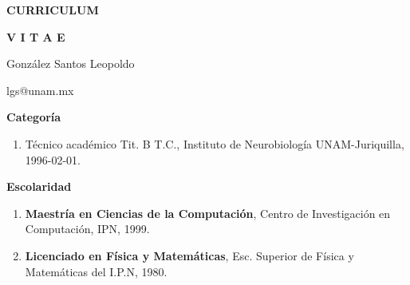 \documentclass[11pt]{article}
\begin{document}
\begin{center}
\textbf{CURRICULUM}

\textbf{V I T A E}

\hfill

González Santos Leopoldo

lgs@unam.mx
\end{center}

{\large \textbf{\color{red} \textbf{Categoría}}}

\begin{enumerate}
\item Técnico académico Tit. B T.C., Instituto de Neurobiología UNAM-Juriquilla, 1996-02-01.
\end{enumerate}

{\large \textbf{\color{red}\textbf{Escolaridad}}}

\begin{enumerate}
\item \textbf{Maestría en Ciencias de la Computación}, Centro de Investigación en 
Computación, IPN, 1999.

\item \textbf{Licenciado en Física y Matemáticas}, Esc. Superior de Física y 
Matemáticas del I.P.N, 1980.
\end{enumerate}

%
%
%
%
%
%
%
%
%

%
%


%
\end{document}
